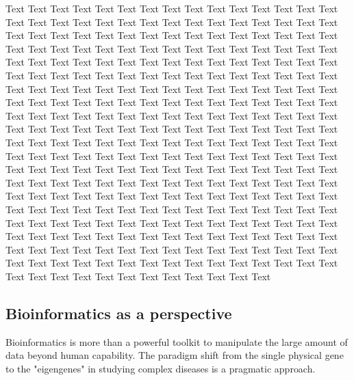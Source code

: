 \documentclass{bioinfo}
\begin{document}
Text Text Text Text Text Text  Text Text Text Text Text Text Text Text  Text Text Text Text Text Text Text Text  Text Text Text Text Text Text Text Text  Text Text Text Text Text Text Text Text  Text Text Text Text Text Text Text Text  Text Text Text Text Text Text Text Text  Text Text Text Text Text Text Text Text  Text Text Text Text Text Text Text Text  Text Text Text Text Text Text Text Text  Text Text Text Text Text Text Text Text  Text Text Text Text Text Text Text Text  Text Text Text Text Text Text Text Text  Text Text Text Text Text Text Text Text  Text Text Text Text Text Text Text Text  Text Text Text Text Text Text Text Text  Text Text Text Text Text Text Text Text  Text Text Text Text Text Text Text Text  Text Text Text Text Text Text Text Text  Text Text Text Text Text Text Text Text  Text Text Text Text Text Text Text Text  Text Text Text Text Text Text Text Text  Text Text Text Text Text Text Text Text  Text Text Text Text Text Text Text Text  Text Text Text Text Text Text Text Text  Text Text Text Text Text Text Text Text  Text Text Text Text Text Text Text Text  Text Text Text Text Text Text Text Text  Text Text Text Text Text Text Text Text  Text Text Text Text Text Text Text Text  Text Text Text Text Text Text Text Text  Text Text Text Text Text Text Text Text  Text Text Text Text Text Text Text Text  Text Text Text Text Text Text Text Text  Text Text Text Text Text Text Text Text  Text Text Text Text Text Text Text Text  Text Text Text Text Text Text Text Text  Text Text Text Text Text Text Text Text  Text Text Text Text Text Text Text Text  Text Text 
%
%
%
%
\subsection{Bioinformatics as a perspective}

Bioinformatics is more than a powerful toolkit to manipulate the large amount of data beyond human capability. The paradigm shift from the single physical gene to the "eigengenes" in studying complex diseases \cite{Weiss:2012:Good} is a pragmatic approach.
\end{document}
